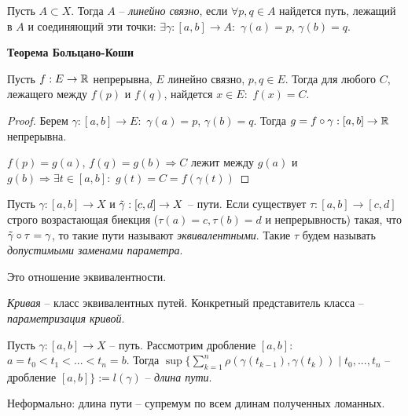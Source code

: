 \begin{definition}
    Пусть $A\subset X$. Тогда $A$ – \textit{линейно связно}, если $\forall p, q\in A$ найдется путь, лежащий в $A$ и соединяющий эти точки: $\exists \gamma :[a, b]\rightarrow A:$ $\gamma(a)=p$, $\gamma(b)=q$.
\end{definition}

\begin{theorem}
    \textbf{Теорема Больцано-Коши}

    Пусть $f:E\rightarrow \mathbb{R}$ непрерывна, $E$ линейно связно,  $p, q\in E$. Тогда для любого $C$, лежащего между $f(p)$ и $f(q)$, найдется $x\in E:$ $f(x)=C$.
\end{theorem}

\begin{proof}
    Берем $\gamma :[a, b]\rightarrow E:$ $\gamma(a)=p$, $\gamma(b)=q$. Тогда $g=f\circ \gamma: [a, b]\rightarrow\mathbb{R}$ непрерывна. 

    $f(p)=g(a)$, $f(q)=g(b)\Rightarrow C$ лежит между $g(a)$ и $g(b)\Rightarrow \exists t\in [a, b]:$ $g(t)=C=f(\gamma(t))$
\end{proof}

\begin{definition}
    Пусть $\gamma :[a, b]\rightarrow X$ и $\Tilde{\gamma} :[c, d]\rightarrow X$ – пути. Если существует $\tau:[a, b]\rightarrow[c, d]$ строго возрастающая биекция ($\tau(a)=c, \tau(b)=d$ и непрерывность) такая, что $\Tilde{\gamma}\circ \tau =\gamma$, то такие пути называют \textit{эквивалентными}. Такие $\tau$ будем называть \textit{допустимыми заменами параметра}.
\end{definition}

\begin{remark}
    Это отношение эквивалентности.
\end{remark}

\begin{definition}
    \textit{Кривая} – класс эквивалентных путей. Конкретный представитель класса – \textit{параметризация кривой}.
\end{definition}

\begin{definition}
    Пусть $\gamma:[a, b]\rightarrow X$ – путь. Рассмотрим дробление $[a, b]$: $a=t_0<t_1<...<t_n=b$. Тогда $\sup\{\sum\limits_{k=1}^n\rho(\gamma(t_{k-1}), \gamma(t_k))\mid t_0, ..., t_n$ – дробление $[a, b]\}:=l(\gamma)$ – \textit{длина пути}. 

    Неформально: длина пути – супремум по всем длинам полученных ломанных.
\end{definition}

